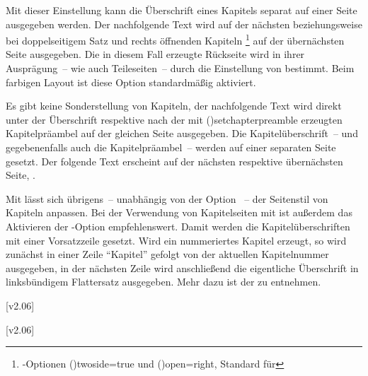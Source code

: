 \begin{DeclareEntity*}{}
\begin{DeclareEntity*}{}
\begin{DeclareEntity*}{}
\begin{Declaration}
Mit dieser Einstellung kann die Überschrift eines Kapitels separat auf einer 
Seite ausgegeben werden. Der nachfolgende Text wird auf der nächsten 
beziehungsweise bei doppelseitigem Satz und rechts öffnenden Kapiteln%
\footnote{%
  \KOMAScript-Optionen \Option(){twoside=true} und 
  \Option(){open=right}, 
  Standard für %
}
auf der übernächsten Seite ausgegeben. Die in diesem Fall erzeugte Rückseite 
wird in ihrer Ausprägung~-- wie auch Teileseiten~-- durch die Einstellung von 
 bestimmt. Beim farbigen Layout ist diese Option 
standardmäßig aktiviert. \notudscrartcl
%
\begin{DeclareValues}[Vakatseiten]{}
  Es gibt keine Sonderstellung von Kapiteln, der nachfolgende Text wird direkt 
  unter der Überschrift respektive nach der mit 
  \Macro(){setchapterpreamble} 
  erzeugten Kapitelpräambel auf der gleichen Seite ausgegeben.
  Die Kapitelüberschrift~-- und gegebenenfalls auch die Kapitelpräambel~-- 
  werden auf einer separaten Seite gesetzt. Der folgende Text erscheint auf der 
  nächsten respektive übernächsten Seite, .
\end{DeclareValues}

Mit 
lässt sich übrigens~-- unabhängig von der Option ~-- der 
Seitenstil von Kapiteln anpassen. Bei der Verwendung von Kapitelseiten mit 
 ist außerdem das Aktivieren der \KOMAScript-Option 
empfehlenswert. Damit werden die Kapitelüberschriften mit einer Vorsatzzeile 
gesetzt. Wird ein nummeriertes Kapitel erzeugt, so wird zunächst in einer Zeile 
\enquote{Kapitel} gefolgt von der aktuellen Kapitelnummer ausgegeben, in der 
nächsten Zeile wird anschließend die eigentliche Überschrift in linksbündigem 
Flattersatz ausgegeben. Mehr dazu ist der  
zu entnehmen.
\end{Declaration}

\begin{Declaration}
  {}
  [v2.06]
\begin{Declaration}
  {}
  [v2.06]
\printdeclarationlist[Schriftelemente]


\end{Declaration}
\end{Declaration}
\end{DeclareEntity*}
\end{DeclareEntity*}
\end{DeclareEntity*}
